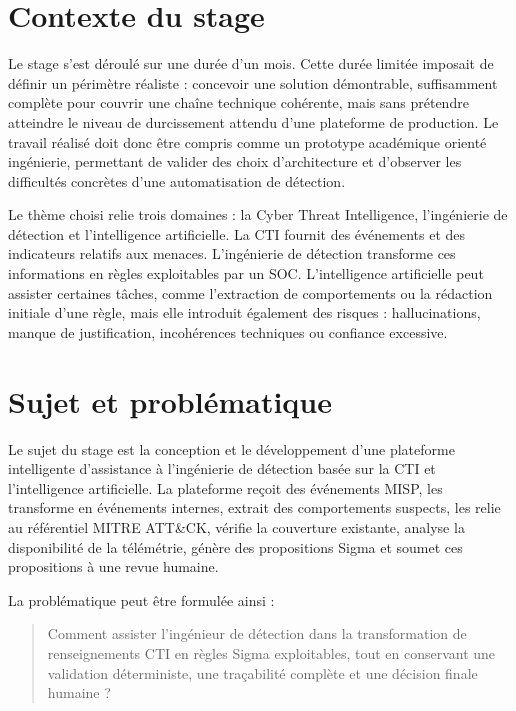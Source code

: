 \section{Contexte du stage}

Le stage s'est déroulé sur une durée d'un mois. Cette durée limitée imposait de définir un périmètre réaliste : concevoir une solution démontrable, suffisamment complète pour couvrir une chaîne technique cohérente, mais sans prétendre atteindre le niveau de durcissement attendu d'une plateforme de production. Le travail réalisé doit donc être compris comme un prototype académique orienté ingénierie, permettant de valider des choix d'architecture et d'observer les difficultés concrètes d'une automatisation de détection.

Le thème choisi relie trois domaines : la Cyber Threat Intelligence, l'ingénierie de détection et l'intelligence artificielle. La CTI fournit des événements et des indicateurs relatifs aux menaces. L'ingénierie de détection transforme ces informations en règles exploitables par un SOC. L'intelligence artificielle peut assister certaines tâches, comme l'extraction de comportements ou la rédaction initiale d'une règle, mais elle introduit également des risques : hallucinations, manque de justification, incohérences techniques ou confiance excessive.

\section{Sujet et problématique}

Le sujet du stage est la conception et le développement d'une plateforme intelligente d'assistance à l'ingénierie de détection basée sur la CTI et l'intelligence artificielle. La plateforme reçoit des événements MISP, les transforme en événements internes, extrait des comportements suspects, les relie au référentiel MITRE ATT\&CK, vérifie la couverture existante, analyse la disponibilité de la télémétrie, génère des propositions Sigma et soumet ces propositions à une revue humaine.

La problématique peut être formulée ainsi :

\begin{quote}
Comment assister l'ingénieur de détection dans la transformation de renseignements CTI en règles Sigma exploitables, tout en conservant une validation déterministe, une traçabilité complète et une décision finale humaine ?
\end{quote}

